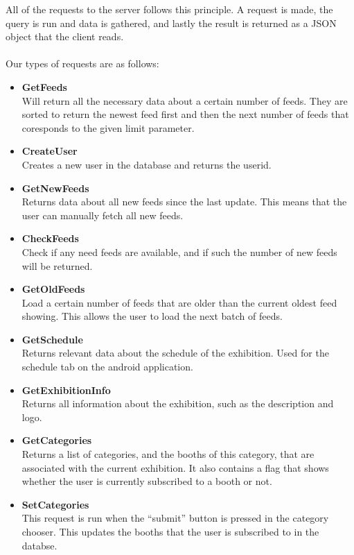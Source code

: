 All of the requests to the server follows this principle. A request is made, the query is run and data is gathered, and lastly the result is returned as a JSON object that the client reads.\\\\
Our types of requests are as follows:
\begin{itemize}
\item \textbf{GetFeeds}\\
 Will return all the necessary data about a certain number of feeds. They are sorted to return the newest feed first and then the next number of feeds that coresponds to the given limit parameter.
\item \textbf{CreateUser}\\
  Creates a new user in the database and returns the userid.
\item \textbf{GetNewFeeds}\\
  Returns data about all new feeds since the last update. This means that the user can manually fetch all new feeds.
\item \textbf{CheckFeeds}\\
  Check if any need feeds are available, and if such the number of new feeds will be returned.
\item \textbf{GetOldFeeds}\\
  Load a certain number of feeds that are older than the current oldest feed showing. This allows the user to load the next batch of feeds.
\item \textbf{GetSchedule}\\
  Returns relevant data about the schedule of the exhibition. Used for the schedule tab on the android application.
\item \textbf{GetExhibitionInfo}\\
  Returns all information about the exhibition, such as the description and logo.
\item \textbf{GetCategories}\\
  Returns a list of categories, and the booths of this category, that are associated with the current exhibition. It also contains a flag that shows whether the user is currently subscribed to a booth or not.
\item \textbf{SetCategories}\\
  This request is run when the ``submit'' button is pressed in the category chooser. This updates the booths that the user is subscribed to in the databse.
\end{itemize}

